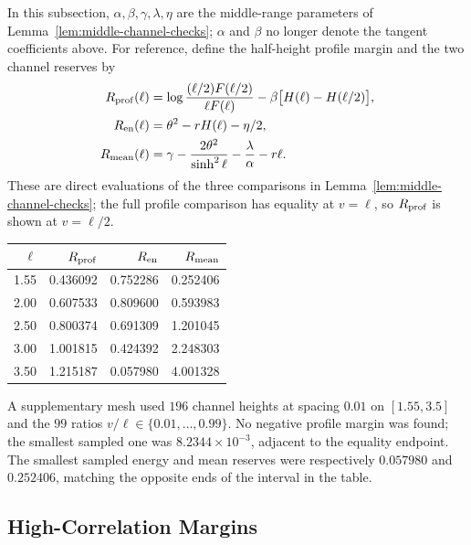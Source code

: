 In this subsection, \(\alpha,\beta,\gamma,\lambda,\eta\) are the
middle-range parameters of Lemma~\ref{lem:middle-channel-checks};
\(\alpha\) and \(\beta\) no longer denote the tangent coefficients above.
For reference, define the half-height profile margin and the two
channel reserves by
\begin{align*}
 R_{\rm prof}(\ell)
 &=\log\frac{(\ell/2)F(\ell/2)}{\ell F(\ell)}
   -\beta\bigl[H(\ell)-H(\ell/2)\bigr],\\
 R_{\rm en}(\ell)&=\theta^2-rH(\ell)-\eta/2,\\
 R_{\rm mean}(\ell)
 &=\gamma-\frac{2\theta^2}{\sinh^2\ell}
                -\frac\lambda\alpha-r\ell.
\end{align*}
These are direct evaluations of the three comparisons in
Lemma~\ref{lem:middle-channel-checks}; the full profile comparison has
equality at \(v=\ell\), so \(R_{\rm prof}\) is shown at \(v=\ell/2\).
\begin{center}
{\small\setlength{\tabcolsep}{7pt}\renewcommand{\arraystretch}{1.08}
\begin{tabular}{@{}rrrr@{}}
\toprule
\(\ell\) & \(R_{\rm prof}\) & \(R_{\rm en}\) & \(R_{\rm mean}\)\\ \midrule
1.55 & 0.436092 & 0.752286 & 0.252406\\
2.00 & 0.607533 & 0.809600 & 0.593983\\
2.50 & 0.800374 & 0.691309 & 1.201045\\
3.00 & 1.001815 & 0.424392 & 2.248303\\
3.50 & 1.215187 & 0.057980 & 4.001328\\
\bottomrule
\end{tabular}}
\end{center}
A supplementary mesh used \(196\) channel heights at spacing \(0.01\)
on \([1.55,3.5]\) and the \(99\) ratios
\(v/\ell\in\{0.01,\ldots,0.99\}\). No negative profile margin was
found; the smallest sampled one was \(8.2344\times10^{-3}\), adjacent
to the equality endpoint. The smallest sampled energy and mean reserves
were respectively \(0.057980\) and \(0.252406\), matching the opposite
ends of the interval in the table.

\subsection{High-Correlation Margins}

